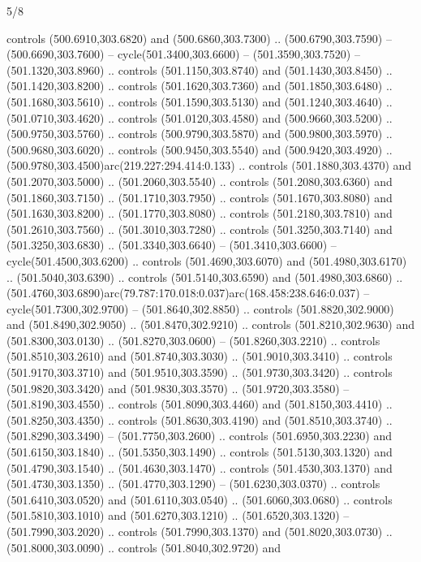 \begin{flagdescription}{5/8}
\begin{scope}[xshift=0.5\flaglength,yshift=0.5\flagwidth,scale=\flagwidth/475.63]
\begin{scope}[y=0.8pt, x=0.8pt, yscale=-1, xscale=1,shift={(-450,-300)}]
\begin{scope}[cm={{1.0,0.0,0.0,1.0,(-0.0002,0.12556)}},cm={{1.0,0.0,0.0,1.0,(0.00179,0.0)}}]
\begin{scope}[cm={{1.11592,0.0,0.0,1.11592,(-106.89933,-41.77764)}}]
\begin{scope}[draw=black,fill=cfff]
\begin{scope}[fill=black]
  controls (500.6910,303.6820) and (500.6860,303.7300) .. (500.6790,303.7590) --
  (500.6690,303.7600) -- cycle(501.3400,303.6600) -- (501.3590,303.7520) --
  (501.1320,303.8960) .. controls (501.1150,303.8740) and (501.1430,303.8450) ..
  (501.1420,303.8200) .. controls (501.1620,303.7360) and (501.1850,303.6480) ..
  (501.1680,303.5610) .. controls (501.1590,303.5130) and (501.1240,303.4640) ..
  (501.0710,303.4620) .. controls (501.0120,303.4580) and (500.9660,303.5200) ..
  (500.9750,303.5760) .. controls (500.9790,303.5870) and (500.9800,303.5970) ..
  (500.9680,303.6020) .. controls (500.9450,303.5540) and (500.9420,303.4920) ..
  (500.9780,303.4500)arc(219.227:294.414:0.133) .. controls (501.1880,303.4370)
  and (501.2070,303.5000) .. (501.2060,303.5540) .. controls (501.2080,303.6360)
  and (501.1860,303.7150) .. (501.1710,303.7950) .. controls (501.1670,303.8080)
  and (501.1630,303.8200) .. (501.1770,303.8080) .. controls (501.2180,303.7810)
  and (501.2610,303.7560) .. (501.3010,303.7280) .. controls (501.3250,303.7140)
  and (501.3250,303.6830) .. (501.3340,303.6640) -- (501.3410,303.6600) --
  cycle(501.4500,303.6200) .. controls (501.4690,303.6070) and
  (501.4980,303.6170) .. (501.5040,303.6390) .. controls (501.5140,303.6590) and
  (501.4980,303.6860) ..
  (501.4760,303.6890)arc(79.787:170.018:0.037)arc(168.458:238.646:0.037) --
  cycle(501.7300,302.9700) -- (501.8640,302.8850) .. controls
  (501.8820,302.9000) and (501.8490,302.9050) .. (501.8470,302.9210) .. controls
  (501.8210,302.9630) and (501.8300,303.0130) .. (501.8270,303.0600) --
  (501.8260,303.2210) .. controls (501.8510,303.2610) and (501.8740,303.3030) ..
  (501.9010,303.3410) .. controls (501.9170,303.3710) and (501.9510,303.3590) ..
  (501.9730,303.3420) .. controls (501.9820,303.3420) and (501.9830,303.3570) ..
  (501.9720,303.3580) -- (501.8190,303.4550) .. controls (501.8090,303.4460) and
  (501.8150,303.4410) .. (501.8250,303.4350) .. controls (501.8630,303.4190) and
  (501.8510,303.3740) .. (501.8290,303.3490) -- (501.7750,303.2600) .. controls
  (501.6950,303.2230) and (501.6150,303.1840) .. (501.5350,303.1490) .. controls
  (501.5130,303.1320) and (501.4790,303.1540) .. (501.4630,303.1470) .. controls
  (501.4530,303.1370) and (501.4730,303.1350) .. (501.4770,303.1290) --
  (501.6230,303.0370) .. controls (501.6410,303.0520) and (501.6110,303.0540) ..
  (501.6060,303.0680) .. controls (501.5810,303.1010) and (501.6270,303.1210) ..
  (501.6520,303.1320) -- (501.7990,303.2020) .. controls (501.7990,303.1370) and
  (501.8020,303.0730) .. (501.8000,303.0090) .. controls (501.8040,302.9720) and

\end{scope}
\end{scope}
\end{scope}
\end{scope}
\end{scope}
\end{scope}
\end{flagdescription}
